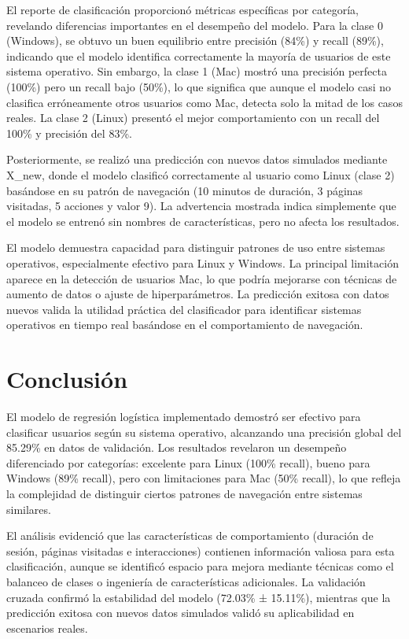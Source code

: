 \documentclass{article}
\begin{document}
El reporte de clasificación proporcionó métricas específicas por categoría, revelando diferencias importantes en el desempeño del modelo. Para la clase 0 (Windows), se obtuvo un buen equilibrio entre precisión (84\%) y recall (89\%), indicando que el modelo identifica correctamente la mayoría de usuarios de este sistema operativo. Sin embargo, la clase 1 (Mac) mostró una precisión perfecta (100\%) pero un recall bajo (50\%), lo que significa que aunque el modelo casi no clasifica erróneamente otros usuarios como Mac, detecta solo la mitad de los casos reales. La clase 2 (Linux) presentó el mejor comportamiento con un recall del 100\% y precisión del 83\%.

Posteriormente, se realizó una predicción con nuevos datos simulados mediante X\_new, donde el modelo clasificó correctamente al usuario como Linux (clase 2) basándose en su patrón de navegación (10 minutos de duración, 3 páginas visitadas, 5 acciones y valor 9). La advertencia mostrada indica simplemente que el modelo se entrenó sin nombres de características, pero no afecta los resultados.

El modelo demuestra capacidad para distinguir patrones de uso entre sistemas operativos, especialmente efectivo para Linux y Windows. La principal limitación aparece en la detección de usuarios Mac, lo que podría mejorarse con técnicas de aumento de datos o ajuste de hiperparámetros. La predicción exitosa con datos nuevos valida la utilidad práctica del clasificador para identificar sistemas operativos en tiempo real basándose en el comportamiento de navegación.

\newpage

\section*{Conclusión}

El modelo de regresión logística implementado demostró ser efectivo para clasificar usuarios según su sistema operativo, alcanzando una precisión global del 85.29\% en datos de validación. Los resultados revelaron un desempeño diferenciado por categorías: excelente para Linux (100\% recall), bueno para Windows (89\% recall), pero con limitaciones para Mac (50\% recall), lo que refleja la complejidad de distinguir ciertos patrones de navegación entre sistemas similares.

El análisis evidenció que las características de comportamiento (duración de sesión, páginas visitadas e interacciones) contienen información valiosa para esta clasificación, aunque se identificó espacio para mejora mediante técnicas como el balanceo de clases o ingeniería de características adicionales. La validación cruzada confirmó la estabilidad del modelo (72.03\% ± 15.11\%), mientras que la predicción exitosa con nuevos datos simulados validó su aplicabilidad en escenarios reales.
\end{document}
